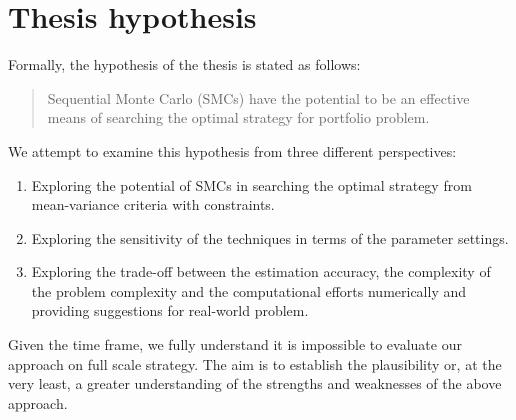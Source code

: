 \section{Thesis hypothesis}
Formally, the hypothesis of the thesis is stated as follows:
\begin{quote}
Sequential Monte Carlo (SMCs) have the potential to be an effective means of searching the optimal strategy for portfolio problem.
\end{quote}
We attempt to examine this hypothesis from three different perspectives:
\begin{enumerate}
\item Exploring the potential of SMCs in searching the optimal strategy from mean-variance criteria with constraints.
\item Exploring the sensitivity of the techniques in terms of the parameter settings.
\item Exploring the trade-off between the estimation accuracy, the complexity of the problem complexity and the computational efforts numerically and providing suggestions for real-world problem.
\end{enumerate}
Given the time frame, we fully understand it is impossible to evaluate our approach on full scale strategy. The aim is to establish the plausibility or, at the very least, a greater understanding of the strengths and weaknesses of the above approach.

